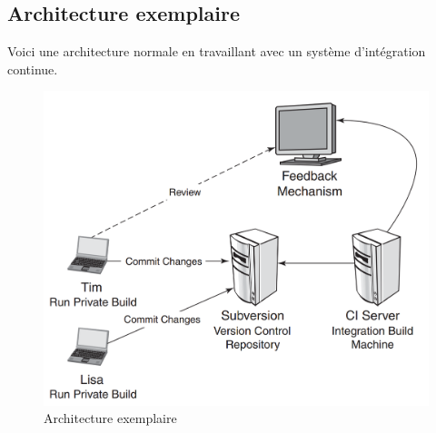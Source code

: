 \subsection{Architecture exemplaire}
Voici une architecture normale en travaillant avec un système d'intégration continue.
\begin{figure}[H]
	\centering
		\includegraphics[scale=0.6]{bilder/architecture_exemplaire}
	\caption{Architecture exemplaire}
	\label{fig:processus}
\end{figure}

